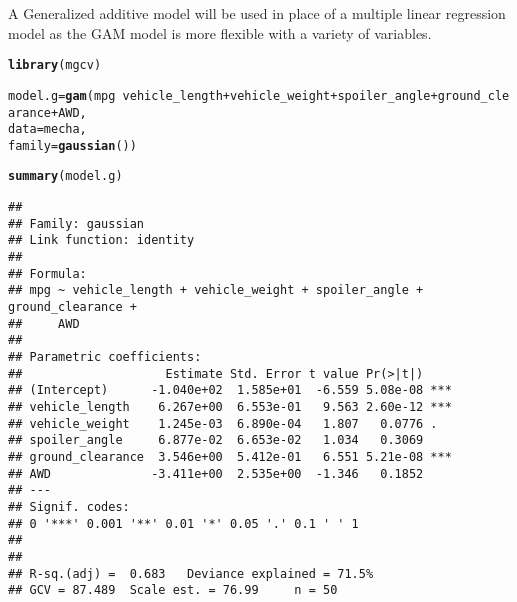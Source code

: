 \documentclass[a4paper, 12pt]{article}\usepackage[]{graphicx}\usepackage[]{color}
\makeatletter
\newcommand{\hlopt}[1]{\textcolor[rgb]{0,0,0}{#1}}%
\newcommand{\hlstd}[1]{\textcolor[rgb]{0.345,0.345,0.345}{#1}}%
\newcommand{\hlkwb}[1]{\textcolor[rgb]{0.69,0.353,0.396}{#1}}%
\newcommand{\hlkwc}[1]{\textcolor[rgb]{0.333,0.667,0.333}{#1}}%
\newcommand{\hlkwd}[1]{\textcolor[rgb]{0.737,0.353,0.396}{\textbf{#1}}}%
\newenvironment{kframe}{%
 \def\at@end@of@kframe{}%
 \ifinner\ifhmode%
  \def\at@end@of@kframe{\end{minipage}}%
  \begin{minipage}{\columnwidth}%
 \fi\fi%
 \def\FrameCommand##1{\hskip\@totalleftmargin \hskip-\fboxsep
 \colorbox{shadecolor}{##1}\hskip-\fboxsep
     \hskip-\linewidth \hskip-\@totalleftmargin \hskip\columnwidth}%
 \MakeFramed {\advance\hsize-\width
   \@totalleftmargin\z@ \linewidth\hsize
   \@setminipage}}%
 {\par\unskip\endMakeFramed%
 \at@end@of@kframe}
\newenvironment{knitrout}{}{} %
\makeatother
\begin{document}
A Generalized additive model will be used in place of a multiple linear regression model as the GAM model is more flexible with a variety of variables. 
\begin{knitrout}
\color{fgcolor}\begin{kframe}
\begin{alltt}
\hlkwd{library}\hlstd{(mgcv)}
\end{alltt}


{\ttfamily\noindent\itshape\color{messagecolor}{\#\# Loading required package: nlme}}

{\ttfamily\noindent\itshape{}}\begin{alltt}
\hlstd{model.g} \hlkwb{=} \hlkwd{gam}\hlstd{(mpg} \hlopt{~} \hlstd{vehicle_length} \hlopt{+} \hlstd{vehicle_weight} \hlopt{+} \hlstd{spoiler_angle} \hlopt{+} \hlstd{ground_clearance} \hlopt{+} \hlstd{AWD,}
              \hlkwc{data} \hlstd{= mecha,}
              \hlkwc{family}\hlstd{=}\hlkwd{gaussian}\hlstd{())}

\hlkwd{summary}\hlstd{(model.g)}
\end{alltt}
\begin{verbatim}
## 
## Family: gaussian 
## Link function: identity 
## 
## Formula:
## mpg ~ vehicle_length + vehicle_weight + spoiler_angle + ground_clearance + 
##     AWD
## 
## Parametric coefficients:
##                    Estimate Std. Error t value Pr(>|t|)    
## (Intercept)      -1.040e+02  1.585e+01  -6.559 5.08e-08 ***
## vehicle_length    6.267e+00  6.553e-01   9.563 2.60e-12 ***
## vehicle_weight    1.245e-03  6.890e-04   1.807   0.0776 .  
## spoiler_angle     6.877e-02  6.653e-02   1.034   0.3069    
## ground_clearance  3.546e+00  5.412e-01   6.551 5.21e-08 ***
## AWD              -3.411e+00  2.535e+00  -1.346   0.1852    
## ---
## Signif. codes:  
## 0 '***' 0.001 '**' 0.01 '*' 0.05 '.' 0.1 ' ' 1
## 
## 
## R-sq.(adj) =  0.683   Deviance explained = 71.5%
## GCV = 87.489  Scale est. = 76.99     n = 50
\end{verbatim}
\end{kframe}
\end{knitrout}
\end{document}
